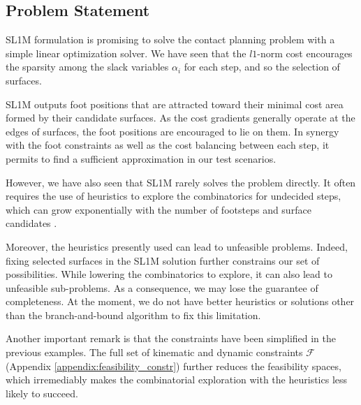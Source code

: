 \subsection{Problem Statement}
SL1M formulation is promising to solve the contact planning problem with a simple linear optimization solver.
We have seen that the $l1$-norm cost encourages the sparsity among the slack variables $\alpha_i$ for each step, and so the selection of surfaces.

SL1M outputs foot positions that are attracted toward their minimal cost area formed by their candidate surfaces.
As the cost gradients generally operate at the edges of surfaces, the foot positions are encouraged to lie on them.
In synergy with the foot constraints as well as the cost balancing between each step, it permits to find a sufficient approximation in our test scenarios.

However, we have also seen that SL1M rarely solves the problem directly. 
It often requires the use of heuristics to explore the combinatorics for undecided steps, which can grow exponentially with the number of footsteps and surface candidates \cite{sl1m_v1}.

Moreover, the heuristics presently used can lead to unfeasible problems. 
Indeed, fixing selected surfaces in the SL1M solution further constrains our set of possibilities. While lowering the combinatorics to explore, it can also lead to unfeasible sub-problems. As a consequence, we may lose the guarantee of completeness.
At the moment, we do not have better heuristics or solutions other than the branch-and-bound algorithm to fix this limitation.

Another important remark is that the constraints have been simplified in the previous examples.
The full set of kinematic and dynamic constraints $\mathcal{F}$ (Appendix \ref{appendix:feasibility_constr}) further reduces the feasibility spaces, which irremediably makes the combinatorial exploration with the heuristics less likely to succeed.

